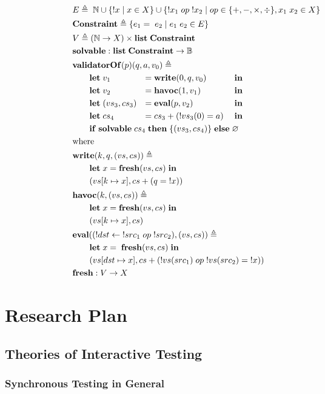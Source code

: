 \documentclass{article}
\theoremstyle{definition}
\newcommand{\Let}{\ottkw{let}\;}
\newcommand{\In}{\;\ottkw{in}}
\newcommand{\letin}[2]{\Let#1=#2\In}
\newcommand{\Some}[1]{\{#1\}}
\newcommand{\None}{\varnothing}
\newcommand{\List}{\ottkw{list}\;}
\newcommand{\validatorOf}{\ottkw{validatorOf}}
\newcommand{\Constraint}{\ottkw{Constraint}}
\newcommand{\fresh}{\ottkw{fresh}}
\newcommand{\solvable}{\ottkw{solvable}}
\newcommand{\Write}{\ottkw{write}}
\newcommand{\Havoc}{\ottkw{havoc}}
\newcommand{\Eval}{\ottkw{eval}}
\newcommand{\If}{\ottkw{if}\;}
\newcommand{\Then}{\ottkw{then}\;}
\newcommand{\Else}{\ottkw{else}\;}
\newcommand{\bool}{\mathbb B}
\begin{document}
\begin{align*}
  \rlap{$E\triangleq\; \mathbb N \cup \{!x\mid x\in X\} \cup \{!x_1\;op\;!x_2\mid
    op\in\{+,-,\times,\div\}, x_1\;x_2\in X\}$}\\
  \rlap{$\Constraint\triangleq\{e_1=\;e_2\mid e_1\;e_2\in E\}$}\\
  \rlap{$V\triangleq(\mathbb N\to X)\times\List\Constraint$} \\
  \rlap{$\solvable:\List\Constraint\to\bool$}\\
  \rlap{$\validatorOf(p)(q,a,v_0)\triangleq\;$}\\
  &\qquad\letin{v_1&}{\;&\Write(0,q,v_0)&}\\
  &\qquad\letin{v_2&}{\;&\Havoc(1,v_1)&}\\
  &\qquad\letin{(vs_3,cs_3)&}{\;&\Eval(p,v_2)&}\\
  &\qquad\letin{cs_4&}{\;&cs_3+(!vs_3(0)=a)&}\\
  \rlap{$\qquad\If \solvable\;cs_4\;\Then \Some{(vs_3,cs_4)}\;\Else \None$}\\
  \rlap{where}\\
  \rlap{$\Write(k,q,(vs,cs))\triangleq$}\\
  \rlap{$\qquad\letin{x}{\fresh(vs,cs)}$}\\
  \rlap{$\qquad(vs[k\mapsto x],cs+(q=\;!x))$}\\
  \rlap{$\Havoc(k,(vs,cs))\triangleq$}\\
  \rlap{$\qquad\letin{x}{\fresh(vs,cs)}$}\\
  \rlap{$\qquad(vs[k\mapsto x],cs)$}\\
  \rlap{$\Eval((!dst\gets\;!src_1\;op\;!src_2),(vs,cs))\triangleq$}\\
  \rlap{$\qquad\letin{x}{\;\fresh(vs,cs)}$}\\
  \rlap{$\qquad(vs[dst\mapsto x],cs+(!vs(src_1)\;op\;!vs(src_2)=\;!x))$}\\
  \rlap{$\fresh:V\to X$}\\
\end{align*}

\section{Research Plan}

\subsection{Theories of Interactive Testing}

\subsubsection{Synchronous Testing in General}
\end{document}
